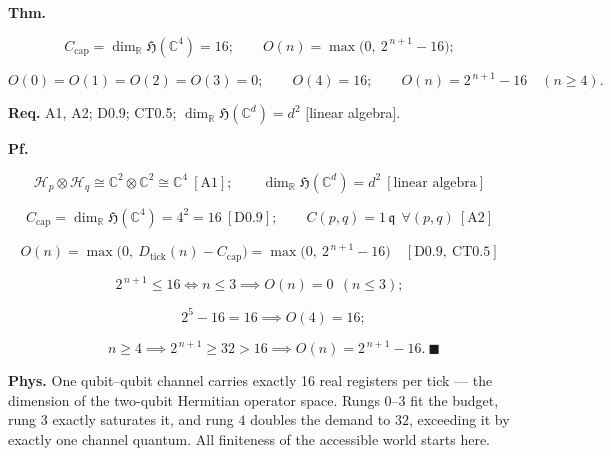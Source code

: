 \begin{theorem}\label{tag:CT0-6}
\textbf{Thm.}

\[
C_{\mathrm{cap}}=\dim_{\mathbb R}\mathfrak H(\mathbb C^4)=16;\qquad
O(n)=\max\bigl(0,\ 2^{\,n+1}-16\bigr);
\]

\[
O(0)=O(1)=O(2)=O(3)=0;\qquad O(4)=16;\qquad O(n)=2^{\,n+1}-16\quad(n\ge4).
\]

\textbf{Req.} A1, A2; D0.9; CT0.5; $\dim_{\mathbb R}\mathfrak H(\mathbb C^d)=d^2$ [linear algebra].

\textbf{Pf.}

\[
\mathcal H_p\otimes\mathcal H_q\cong\mathbb C^2\otimes\mathbb C^2\cong\mathbb C^4\ [\mathrm{A1}];\qquad
\dim_{\mathbb R}\mathfrak H(\mathbb C^d)=d^2\ [\text{linear algebra}]
\]

\[
C_{\mathrm{cap}}=\dim_{\mathbb R}\mathfrak H(\mathbb C^4)=4^2=16\ [\mathrm{D0.9}];\qquad C(p,q)=1\,\mathfrak q\ \ \forall(p,q)\ [\mathrm{A2}]
\]

\[
O(n)=\max\bigl(0,\ D_{\mathrm{tick}}(n)-C_{\mathrm{cap}}\bigr)=\max\bigl(0,\ 2^{\,n+1}-16\bigr)\quad[\mathrm{D0.9},\ \mathrm{CT0.5}]
\]

\[
2^{\,n+1}\le16\iff n\le3\implies O(n)=0\ \ (n\le3);
\]

\[
\qquad 2^{5}-16=16\implies O(4)=16;
\]

\[
\qquad n\ge4\implies2^{\,n+1}\ge32>16\implies O(n)=2^{\,n+1}-16.\ \blacksquare
\]

\textbf{Phys.} One qubit–qubit channel carries exactly 16 real registers per tick — the dimension of the two-qubit Hermitian operator space. Rungs $0$–$3$ fit the budget, rung $3$ exactly saturates it, and rung $4$ doubles the demand to $32$, exceeding it by exactly one channel quantum. All finiteness of the accessible world starts here.

\end{theorem}

